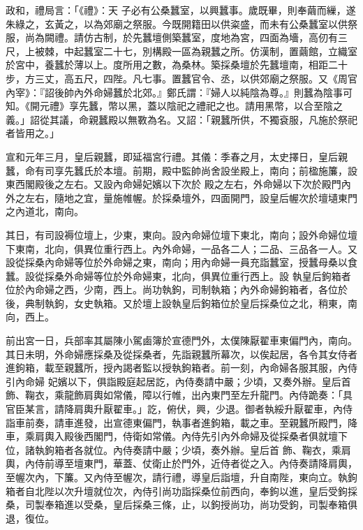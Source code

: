 \begin{pinyinscope}
 政和，禮局言：「《禮》：天
 子必有公桑蠶室，以興蠶事。歲既畢，則奉繭而繅，遂朱綠之，玄黃之，以為郊廟之祭服。今既開籍田以供粢盛，而未有公桑蠶室以供祭服，尚為闕禮。請仿古制，於先蠶壇側築蠶室，度地為宮，四面為墻，高仞有三尺，上被棘，中起蠶室二十七，別構殿一區為親蠶之所。仿漢制，置繭館，立織室於宮中，養蠶於薄以上。度所用之數，為桑林。築採桑壇於先蠶壇南，相距二十步，方三丈，高五尺，四陛。凡七事。置蠶官令、丞，以供郊廟之祭服。又《周官
 內宰》：『詔後帥內外命婦蠶於北郊。』鄭氏謂：『婦人以純陰為尊。』則蠶為陰事可知。《開元禮》享先蠶，幣以黑，蓋以陰祀之禮祀之也。請用黑幣，以合至陰之義。」詔從其議，命親蠶殿以無斁為名。又詔：「親蠶所供，不獨袞服，凡施於祭祀者皆用之。」



 宣和元年三月，皇后親蠶，即延福宮行禮。其儀：季春之月，太史擇日，皇后親蠶，命有司享先蠶氏於本壇。前期，殿中監帥尚舍設坐殿上，南向；前楹施簾，設東西閣殿後之左右。又設內命婦妃嬪以下次於
 殿之左右，外命婦以下次於殿門內外之左右，隨地之宜，量施帷幄。於採桑壇外，四面開門，設皇后幄次於壇壝東門之內道北，南向。



 其日，有司設褥位壇上，少東，東向。設內命婦位壇下東北，南向；設外命婦位壇下東南，北向，俱異位重行西上。內外命婦，一品各二人；二品、三品各一人。又設從採桑內命婦等位於外命婦之東，南向；用內命婦一員充詣蠶室，授蠶母桑以食蠶。設從採桑外命婦等位於外命婦東，北向，俱異位重行西上。設
 執皇后鉤箱者位於內命婦之西，少南，西上。尚功執鉤，司制執箱；內外命婦鉤箱者，各位於後，典制執鉤，女史執箱。又於壇上設執皇后鉤箱位於皇后採桑位之北，稍東，南向，西上。



 前出宮一日，兵部率其屬陳小駕鹵簿於宣德門外，太僕陳厭翟車東偏門內，南向。其日未明，外命婦應採桑及從採桑者，先詣親蠶所幕次，以俟起居，各令其女侍者進鉤箱，載至親蠶所，授內謁者監以授執鉤箱者。前一刻，內命婦各服其服，內侍引內命婦
 妃嬪以下，俱詣殿庭起居訖，內侍奏請中嚴；少頃，又奏外辦。皇后首飾、鞠衣，乘龍飾肩輿如常儀，障以行帷，出內東門至左升龍門。內侍跪奏：「具官臣某言，請降肩輿升厭翟車。」訖，俯伏，興，少退。御者執綏升厭翟車，內侍詣車前奏，請車進發，出宣德東偏門，執事者進鉤箱，載之車。至親蠶所殿門，降車，乘肩輿入殿後西閣門，侍衛如常儀。內侍先引內外命婦及從採桑者俱就壇下位，諸執鉤箱者各就位。內侍奏請中嚴；少頃，奏外辦。皇后首
 飾、鞠衣，乘肩輿，內侍前導至壇東門，華蓋、仗衛止於門外，近侍者從之入。內侍奏請降肩輿，至幄次內，下簾。又內侍至幄次，請行禮，導皇后詣壇，升自南陛，東向立。執鉤箱者自北陛以次升壇就位次，內侍引尚功詣採桑位前西向，奉鉤以進，皇后受鉤採桑，司製奉箱進以受桑，皇后採桑三條，止，以鉤授尚功，尚功受鉤，司製奉箱俱退，復位。




\end{pinyinscope}
